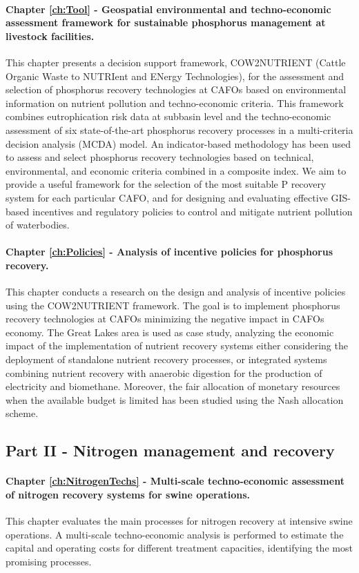 \begin{refsection}[referencesCh1]
\paragraph{Chapter \ref{ch:Tool} - Geospatial environmental and techno-economic assessment framework for sustainable phosphorus management at livestock facilities.} This chapter presents a decision support framework, COW2NUTRIENT (Cattle Organic Waste to NUTRIent and ENergy Technologies), for the assessment and selection of phosphorus recovery technologies at CAFOs based on environmental information on nutrient pollution and techno-economic criteria. This framework combines eutrophication risk data at subbasin level and the techno-economic assessment of six state-of-the-art phosphorus recovery processes in a multi-criteria decision analysis (MCDA) model. An indicator-based methodology has been used to assess and select phosphorus recovery technologies based on technical, environmental, and economic criteria combined in a composite index. We aim to provide a useful framework for the selection of the most suitable P recovery system for each particular CAFO, and for designing and evaluating effective GIS-based incentives and regulatory policies to control and mitigate nutrient pollution of waterbodies.

\paragraph{Chapter \ref{ch:Policies} - Analysis of incentive policies for phosphorus recovery.} This chapter conducts a research on the design and analysis of incentive policies using the COW2NUTRIENT framework. The goal is to implement phosphorus recovery technologies at CAFOs minimizing the negative impact in
CAFOs economy. The Great Lakes area is used as case study, analyzing the economic impact of the implementation of nutrient recovery systems either considering the deployment of standalone nutrient recovery processes, or integrated systems combining nutrient recovery with anaerobic digestion for the production of electricity and biomethane. Moreover, the fair allocation of monetary resources when the available budget is limited has been studied using the Nash allocation scheme.

\subsection{Part II - Nitrogen management and recovery}
\paragraph{Chapter \ref{ch:NitrogenTechs} - Multi-scale techno-economic assessment of nitrogen recovery systems for swine operations.} This chapter evaluates the main processes for nitrogen recovery at intensive swine operations. A multi-scale techno-economic analysis is performed to estimate the capital and operating costs for different treatment capacities, identifying the most promising processes.


\end{refsection}
